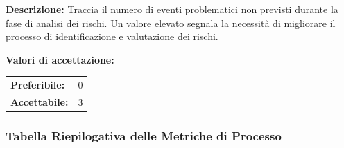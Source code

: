 \documentclass[a4paper,11pt,oneside]{scrartcl}
\begin{document}
\vspace{0.3cm}
\noindent\textbf{Descrizione:} Traccia il numero di eventi problematici non previsti durante la fase di analisi dei rischi. Un valore elevato segnala la necessità di migliorare il processo di identificazione e valutazione dei rischi.

\vspace{0.2cm}
\noindent\textbf{Valori di accettazione:}
\vspace{0.1cm}

\noindent
\begin{tabular}{@{}ll@{}}
    \textbf{Preferibile:} & $0$ \\
    \textbf{Accettabile:} & $3$ \\
\end{tabular}

\subsubsection{Tabella Riepilogativa delle Metriche di Processo}
\end{document}
